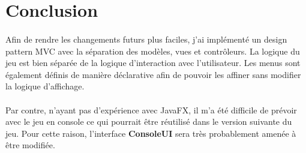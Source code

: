 \documentclass{article}
\begin{document}
    \newpage
    \section*{Conclusion}
    \label{sec:concl}

    \paragraph{}
    Afin de rendre les changements futurs plus faciles, j'ai implémenté un design pattern MVC avec la séparation des modèles, vues et contrôleurs. La logique du jeu est bien séparée de la logique d'interaction avec l'utilisateur. Les menus sont également définis de manière déclarative afin de pouvoir les affiner sans modifier la logique d'affichage.
    
    \paragraph{}
    Par contre, n'ayant pas d'expérience avec JavaFX, il m'a été difficile de prévoir avec le jeu en console ce qui pourrait être réutilisé dans le version suivante du jeu. Pour cette raison, l'interface \textbf{ConsoleUI} sera très probablement amenée à être modifiée.
\end{document}
